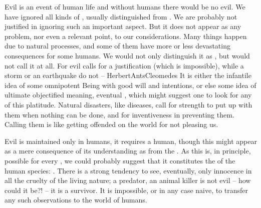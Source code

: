 Evil is an event of human life and without humans there would be no evil. We
have ignored all kinds of , usually distinguished from
.  We are probably not justified in ignoring such an important
aspect. But it does not appear as any problem, nor even a relevant point, to our
considerations. Many things happen due to natural processes, and some of them
have more or less devastating consequences for some humans. We would not only
distinguish it as , but would not call it  at all.
For evil calls for a justification (which is impossible), while a storm or an
earthquake do not -- \citet{catastrophes are innocent.}{HerbertAnts}{Cleomedes}
It is either the infantile idea of some omnipotent Being with good will and
 intentions, or else some idea of ultimate {objectified} meaning,
eventual , which might suggest one to look for any 
of this platitude.  Natural disasters, like diseases, call for strength to put
up with them when nothing can be done, and for inventiveness in preventing them.
Calling them  is like getting offended on the world for not pleasing
us.

Evil is maintained only in humans, it requires a human, though this might appear
as a mere consequence of its understanding as  from the
.  As this is, in principle, possible for every , we
could probably suggest that it constitutes the  of the
human species: .  There is a strong tendency to see,
eventually, only innocence in all the cruelty of the living nature; a predator,
an animal killer is not evil -- how could it be?! -- it is a survivor. It is
impossible, or in any case naive, to transfer any such observations to the world
of humans.


